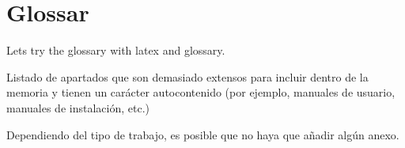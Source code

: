 \documentclass[ENG, BIB]{TFUOC}%
\begin{document}


\chapter{Glossar}
Lets try the glossary with \gls{latex} and \Gls{glossary}.

\printindex
\printglossary[title=Glossary, toctitle=Glossary]
\printglossary[type=\acronymtype, title=Acronyms, toctitle=Acronyms]



\printbibliography[heading=bibintoc]


\newpage
\appendix
Listado de apartados que son demasiado extensos para incluir dentro de la memoria y tienen un carácter autocontenido (por ejemplo, manuales de usuario, manuales de instalación, etc.)
 
Dependiendo del tipo de trabajo, es posible que no haya que añadir algún anexo.
\end{document}
